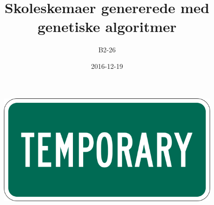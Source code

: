 \begin{titlepage}
  \title{Skoleskemaer genererede med genetiske algoritmer}
  \maketitle
  \date{2016-12-19}
  \author{B2-26}
  \vspace{2cm}

  \begin{figure}[h]
    \centering
    \includegraphics[scale = 0.9]{partials/graphics/forside.png}
  \end{figure}
\end{titlepage}
\clearpage
{}